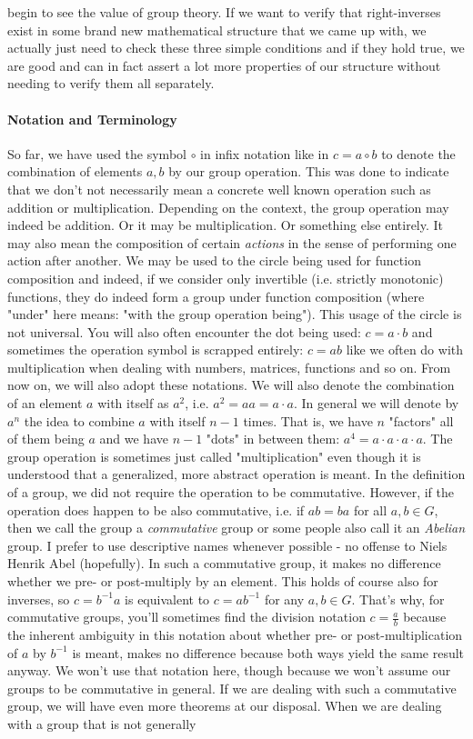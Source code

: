 begin to see the value of group theory. If we want to verify that right-inverses exist in some brand new mathematical structure that we came up with, we actually just need to check these three simple conditions and if they hold true, we are good and can in fact assert a lot more properties of our structure without needing to verify them all separately. 

\paragraph{Notation and Terminology}
So far, we have used the symbol $\circ$ in infix notation like in $c = a \circ b$ to denote the combination of elements $a,b$ by our group operation. This was done to indicate that we don't not necessarily mean a concrete well known operation such as addition or multiplication. Depending on the context, the group operation may indeed be addition. Or it may be multiplication. Or something else entirely. It may also mean the composition of certain \emph{actions} in the sense of performing one action after another. We may be used to the circle being used for function composition and indeed, if we consider only invertible (i.e. strictly monotonic) functions, they do indeed form a group under function composition (where "under" here means: "with the group operation being"). This usage of the circle is not universal. You will also often encounter the dot being used: $c = a \cdot b$ and sometimes the operation symbol is scrapped entirely: $c = a b$ like we often do with multiplication when dealing with numbers, matrices, functions and so on. From now on, we will also adopt these notations. We will also denote the combination of an element $a$ with itself as $a^2$, i.e. $a^2 = a a = a \cdot a$. In general we will denote by $a^n$ the idea to combine $a$ with itself $n-1$ times. That is, we have $n$ "factors" all of them being $a$ and we have $n-1$ "dots" in between them: $a^4 = a \cdot a \cdot a \cdot a$. The group operation is sometimes just called "multiplication" even though it is understood that a generalized, more abstract operation is meant. In the definition of a group, we did not require the operation to be commutative. However, if the operation does happen to be also commutative, i.e. if $a b = b a$ for all $a,b \in G$, then we call the group a \emph{commutative} group or some people also call it an \emph{Abelian} group. I prefer to use descriptive names whenever possible - no offense to Niels Henrik Abel (hopefully). In such a commutative group, it makes no difference whether we pre- or post-multiply by an element. This holds of course also for inverses, so $c = b^{-1} a$ is equivalent to $c = a b^{-1}$ for any $a,b \in G$. That's why, for commutative groups, you'll sometimes find the division notation $c = \frac{a}{b}$ because the inherent ambiguity in this notation about whether pre- or post-multiplication of $a$ by $b^{-1}$ is meant, makes no difference because both ways yield the same result anyway. We won't use that notation here, though because we won't assume our groups to be commutative in general. If we are dealing with such a commutative group, we will have even more theorems at our disposal. When we are dealing with a group that is not generally 